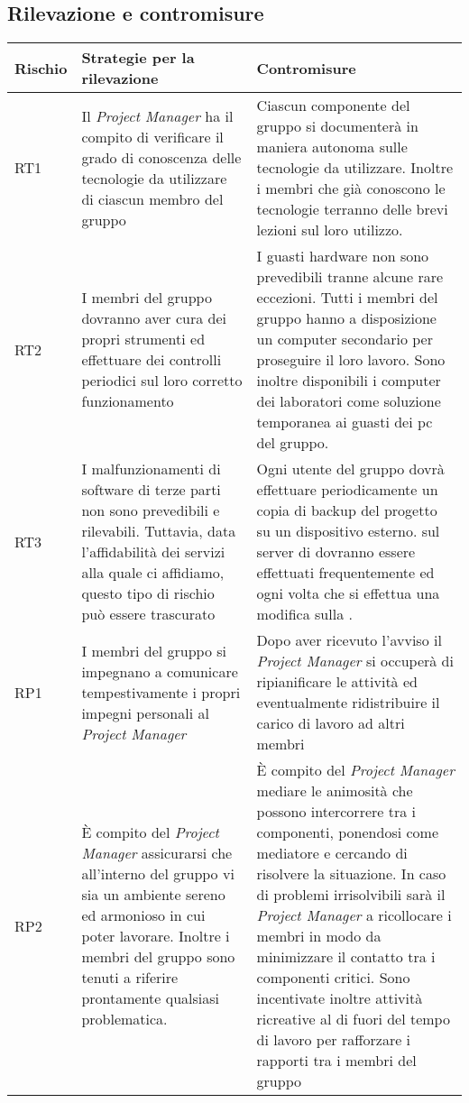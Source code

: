 


\subsection{Rilevazione e contromisure}

\begin{longtable}[H]{|l|P{6cm}|P{8cm}|}
		\hline
		\textbf{Rischio} & \textbf{Strategie per la rilevazione}  & \textbf{Contromisure}  \\
		\hline
		RT1     & Il \emph{Project Manager} ha il compito di verificare il grado di conoscenza delle tecnologie da utilizzare di ciascun membro del gruppo & Ciascun componente del gruppo si documenterà in maniera autonoma sulle tecnologie da utilizzare. Inoltre i membri che già conoscono le tecnologie terranno delle brevi lezioni sul loro utilizzo.\\
		\hline
		RT2     & I membri del gruppo dovranno aver cura dei propri strumenti ed effettuare dei controlli periodici sul loro corretto funzionamento & I guasti hardware non sono prevedibili tranne alcune rare eccezioni. Tutti i membri del gruppo hanno a disposizione un computer secondario per proseguire il loro lavoro. Sono inoltre disponibili i computer dei laboratori come soluzione temporanea ai guasti dei pc del gruppo.\\
		\hline
		RT3     & I malfunzionamenti di software di terze parti non sono prevedibili e rilevabili. Tuttavia, data l'affidabilità dei servizi alla quale ci affidiamo, questo tipo di rischio può essere trascurato & Ogni utente del gruppo dovrà effettuare periodicamente un copia di backup del progetto su un dispositivo esterno.  sul server di  dovranno essere effettuati frequentemente ed ogni volta che si effettua una modifica sulla . \\
		\hline
		RP1     & I membri del gruppo si impegnano a comunicare tempestivamente i propri impegni personali al \emph{Project Manager} & Dopo aver ricevuto l'avviso il \emph{Project Manager} si occuperà di ripianificare le attività ed eventualmente ridistribuire il carico di lavoro ad altri membri \\
		\hline
		RP2     & È compito del \emph{Project Manager} assicurarsi che all'interno del gruppo vi sia un ambiente sereno ed armonioso in cui poter lavorare. Inoltre i membri del gruppo sono tenuti a riferire prontamente qualsiasi problematica. & È compito del \emph{Project Manager} mediare le animosità che possono intercorrere tra i componenti, ponendosi come mediatore e cercando di risolvere la situazione. In caso di problemi irrisolvibili sarà il \emph{Project Manager} a ricollocare i membri in modo da minimizzare il contatto tra i componenti critici. Sono incentivate inoltre attività ricreative al di fuori del tempo di lavoro per rafforzare i rapporti tra i membri del gruppo\\

\end{longtable}
